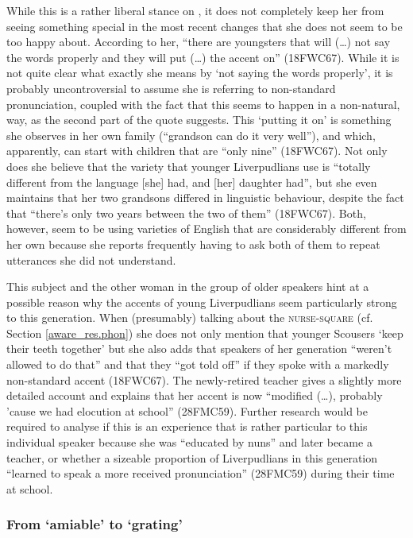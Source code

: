 While this is a rather liberal stance on , it does not completely keep her from seeing something special in the most recent changes that she does not seem to be too happy about.
According to her, ``there are youngsters that will (\ldots) not say the words properly and they will put (\ldots) the  accent on'' (18FWC67).
While it is not quite clear what exactly she means by `not saying the words properly', it is probably uncontroversial to assume she is referring to non-standard pronunciation, coupled with the fact that this seems to happen in a non-natural,  way, as the second part of the quote suggests. This `putting it on' is something she observes in her own family (``grandson can do it very well''), and which, apparently, can start with children that are ``only nine'' (18FWC67).
Not only does she believe that the variety that younger Liverpudlians use is ``totally different from the language [she] had, and [her] daughter had'', but she even maintains that her two grandsons differed in linguistic behaviour, despite the fact that ``there's only two years between the two of them'' (18FWC67).
Both, however, seem to be using varieties of English that are considerably different from her own because she reports frequently having to ask both of them to repeat utterances she did not understand.

This subject and the other woman in the group of older speakers hint at a possible reason why the accents of young Liverpudlians seem particularly strong to this generation.
When (presumably) talking about the \textsc{nurse}-\textsc{square}  (cf. Section \ref{aware_res.phon}) she does not only mention that younger Scousers `keep their teeth together' but she also adds that speakers of her generation ``weren't allowed to do that'' and that they ``got told off'' if they spoke with a markedly non-standard accent (18FWC67).
The newly-retired teacher gives a slightly more detailed account and explains that her accent is now ``modified (\ldots), probably 'cause we had elocution at school'' (28FMC59).
Further research would be required to analyse if this is an experience that is rather particular to this individual speaker because she was ``educated by nuns'' and later became a teacher, or whether a sizeable proportion of Liverpudlians in this generation ``learned to speak a more received pronunciation'' (28FMC59) during their time at school.

\subsubsection{From `amiable' to `grating'}
\label{aware_res.eval.old.like}

